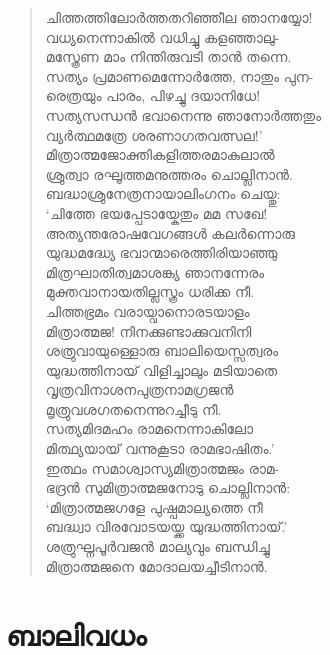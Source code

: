 \begin{verse}
ചിത്തത്തിലോര്‍ത്തതറിഞ്ഞീല ഞാനയ്യോ!\\
വധ്യനെന്നാകില്‍ വധിച്ചു കളഞ്ഞാലു-\\
മസ്ത്രേണ മാം നിന്തിരുവടി താന്‍ തന്നെ.\\
സത്യം പ്രമാണമെന്നോര്‍ത്തേ, നാതും പുന-\\
രെത്രയും പാരം, പിഴച്ചു ദയാനിധേ!\\
സത്യസന്ധന്‍ ഭവാനെന്നു ഞാനോര്‍ത്തതും\\
വ്യര്‍ത്ഥമത്രേ ശരണാഗതവത്സല!’\\
മിത്രാത്മജോക്തികളിത്തരമാകുലാല്‍\\
ശ്രുത്വാ രഘൂത്തമനുത്തരം ചൊല്ലിനാന്‍.\\
ബദ്ധാശ്രുനേത്രനായാലിംഗനം ചെയ്തു:\\
‘ചിത്തേ ഭയപ്പേടായ്കേതും മമ സഖേ!\\
അത്യന്തരോഷവേഗങ്ങള്‍ കലര്‍ന്നൊരു\\
യുദ്ധമദ്ധ്യേ ഭവാന്മാരെത്തിരിയാഞ്ഞു\\
മിത്രഘാതിത്വമാശങ്ക്യ ഞാനന്നേരം\\
മുക്തവാനായതില്ലസ്ത്രം ധരിക്ക നീ.\\
ചിത്തഭ്രമം വരായ്വാനൊരടയാളം\\
മിത്രാത്മജ! നിനക്കുണ്ടാക്കുവനിനി\\
ശത്രുവായുള്ളൊരു ബാലിയെസ്സത്വരം\\
യുദ്ധത്തിനായ് വിളിച്ചാലും മടിയാതെ\\
വൃത്രവിനാശനപുത്രനാമഗ്രജന്‍\\
മൃത്രുവശഗതനെന്നുറച്ചീടു നീ.\\
സത്യമിദമഹം രാമനെന്നാകിലോ\\
മിത്ഥ്യയായ് വന്നുകൂടാ രാമഭാഷിതം.’\\
ഇത്ഥം സമാശ്വാസ്യമിത്രാത്മജം രാമ-\\
ഭദ്രന്‍ സുമിത്രാത്മജനോടു ചൊല്ലിനാന്‍:\\
‘മിത്രാത്മജഗളേ പുഷ്പമാല്യത്തെ നീ\\
ബദ്ധ്വാ വിരവോടയയ്ക്ക യുദ്ധത്തിനായ്.’\\
ശത്രുഘ്നപൂര്‍വജന്‍ മാല്യവും ബന്ധിച്ചു\\
മിത്രാത്മജനെ മോദാലയച്ചീടിനാന്‍.
\end{verse}


\section{ബാലിവധം}

